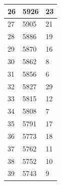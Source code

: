 \documentclass{article}
\begin{document}
\begin{center}
\begin{longtable}{|l|l|l|}
		\hline
		26                                                        & 5926                                                               & 23      \\ 
		\hline
		27                                                        & 5905                                                               & 21      \\ 
		\hline
		28                                                        & 5886                                                               & 19      \\ 
		\hline
		29                                                        & 5870                                                               & 16      \\ 
		\hline
		30                                                        & 5862                                                               & 8       \\ 
		\hline
		31                                                        & 5856                                                               & 6       \\ 
		\hline
		32                                                        & 5827                                                               & 29      \\ 
		\hline
		33                                                        & 5815                                                               & 12      \\ 
		\hline
		34                                                        & 5808                                                               & 7       \\ 
		\hline
		35                                                        & 5791                                                               & 17      \\ 
		\hline
		36                                                        & 5773                                                               & 18      \\ 
		\hline
		37                                                        & 5762                                                               & 11      \\ 
		\hline
		38                                                        & 5752                                                               & 10      \\ 
		\hline
		39                                                        & 5743                                                               & 9       \\ 

\end{longtable}
\end{center}
\end{document}

